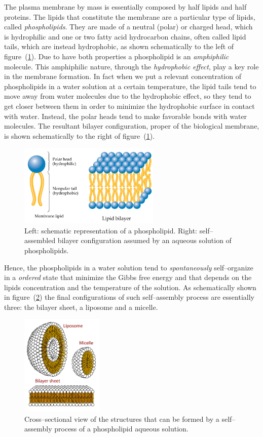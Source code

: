 The plasma membrane by mass is essentially composed by half lipids and half proteins. The lipids that constitute the membrane are a particular type of lipids, called \textit{phospholipids}. They are made of a neutral (polar) or charged head, which is hydrophilic and one or two fatty acid hydrocarbon chains, often called lipid tails, which are instead hydrophobic, as shown schematically to the left of figure~(\ref{fig:phospho}). Due to have both properties a phospholipid is an \textit{amphiphilic} molecule. This amphiphilic nature, through the \textit{hydrophobic effect}, play a key role in the membrane formation. In fact when we put a relevant concentration of phospholipids in a water solution at a certain temperature, the lipid tails tend to move away from water molecules due to the hydrophobic effect, so they tend to get closer between them in order to minimize the hydrophobic surface in contact with water. Instead, the polar heads tend to make favorable bonds with water molecules. The resultant bilayer configuration, proper of the biological membrane, is shown schematically to the right of figure~(\ref{fig:phospho}). 
\begin{figure}[!ht]
	\centering
	\includegraphics[width=0.6\textwidth]{./img/phospholipids}
	\caption{Left: schematic representation of a phospholipid. Right: self--assembled bilayer configuration assumed by an aqueous solution of phospholipids.}
	\label{fig:phospho}
\end{figure}
Hence, the phospholipids in a water solution tend to \textit{spontaneously} self--organize in a \textit{ordered} state that minimize the Gibbs free energy and that depends on the lipids concentration and the temperature of the solution. As schematically shown in figure~(\ref{fig:lipidsStructures}) the final configurations of such self--assembly process are essentially three: the bilayer sheet, a liposome and a micelle.
\begin{figure}
	\centering
	\includegraphics[width=0.35\textwidth]{./img/lipidsStructures}
	\caption{Cross--sectional view of the structures that can be formed by a self--assembly process of a phospholipid aqueous solution.}
	\label{fig:lipidsStructures}
\end{figure}

